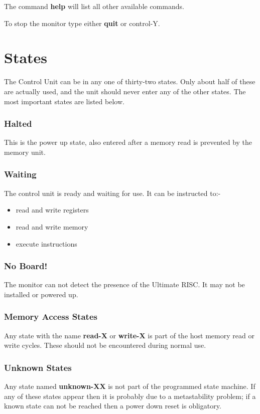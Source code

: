 The command {\bf help} will list  all  other available commands.

To stop the monitor type either {\bf quit} or control-Y.

\section{States}
The Control Unit can be in any one of thirty-two states.
Only about half of these are actually used, and the unit should never enter any of the other states.
The most important states are listed below.
\subsubsection{Halted}
This is the power up state, also entered after a memory read is prevented by the memory unit.

\subsubsection{Waiting}
The control unit is ready and waiting for use.
It can be instructed to:-
\begin{itemize}
\item  read and write registers
\item  read and write memory
\item  execute instructions
\end{itemize}

\subsubsection{No Board!}
The monitor can not detect the presence of the Ultimate RISC.
It may not be installed or powered up.

\subsubsection{Memory Access States}
Any state with the name {\bf read-X} or {\bf write-X} is part of the host memory read
or write cycles. 
These should not be encountered during normal use.

\subsubsection{Unknown States}
Any state named {\bf unknown-XX} is not part of the programmed state machine.
If any of these states appear then it is probably due to a metastability problem;
if a known state can not be reached then a power down reset is obligatory.

